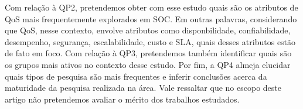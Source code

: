 
Com rela\c{c}\~{a}o \`{a} QP2, pretendemos obter com esse estudo quais s\~{a}o os atributos de QoS mais frequentemente explorados em SOC. Em outras palavras, considerando que QoS, nesse contexto, envolve atributos como disponbilidade, confiabilidade, desempenho, seguran\c{c}a, escalabilidade, custo e SLA, quais desses atributos est\~{a}o de fato em foco. Com rela\c{c}\~{a}o \`{a} QP3, pretendemos tamb\'{e}m identificar quais s\~{a}o os grupos mais ativos no contexto desse estudo. Por fim, a QP4 almeja elucidar quais tipos de pesquisa s\~{a}o mais frequentes e inferir conclusões acerca da maturidade da pesquisa realizada na \'{a}rea. Vale ressaltar que no escopo deste artigo n\~{a}o pretendemos avaliar o m\'{e}rito dos trabalhos estudados.


